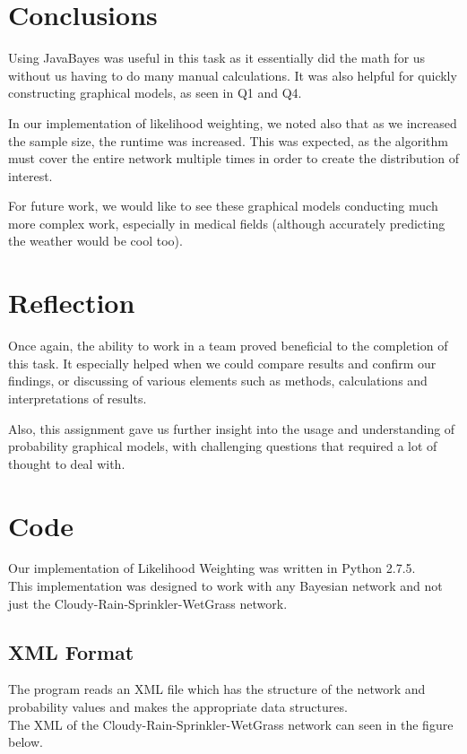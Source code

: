 \documentclass{article}
\begin{document}
\section{Conclusions}
Using JavaBayes was useful in this task as it essentially did the math for us without us having to do many manual calculations. It was also helpful for quickly constructing graphical models, as seen in Q1 and Q4. 

In our implementation of likelihood weighting, we noted also that as we increased the sample size, the runtime was increased. This was expected, as the algorithm must cover the entire network multiple times in order to create the distribution of interest. 

For future work, we would like to see these graphical models conducting much more complex work, especially in medical fields (although accurately predicting the weather would be cool too). 

\section{Reflection}
Once again, the ability to work in a team proved beneficial to the completion of this task. It especially helped when we could compare results and confirm our findings, or discussing of various elements such as methods, calculations and interpretations of results. 

Also, this assignment gave us further insight into the usage and understanding of probability graphical models, with challenging questions that required a lot of thought to deal with.  
\section{Code}
Our implementation of Likelihood Weighting was written in Python 2.7.5.\\

This implementation was designed to work with any Bayesian network and not just the Cloudy-Rain-Sprinkler-WetGrass network.

\subsection{XML Format}
The program reads an XML file which has the structure of the network and probability values and makes the appropriate data structures.\\

The XML of the Cloudy-Rain-Sprinkler-WetGrass network can seen in the figure below.
\end{document}
